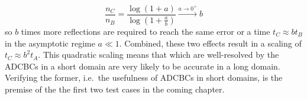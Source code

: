 \begin{equation}
\frac{n_C}{n_B} = \frac{\log\left(1 + a\right)}{\log(1 + \frac{a}{b})} \xrightarrow{a \to 0^+} b
\end{equation}
so $b$ times more reflections are required to reach the same error or a time $t_C \approx b t_B$ in the asymptotic regime $a \ll 1$. Combined, these two effects result in a scaling of $t_C \approx b^2 t_A$. This quadratic scaling means that which are well-resolved by the ADCBCs in a short domain are very likely to be accurate in a long domain. Verifying the former, i.e.\ the usefulness of ADCBCs in short domains, is the premise of the the first two test cases in the coming chapter.



